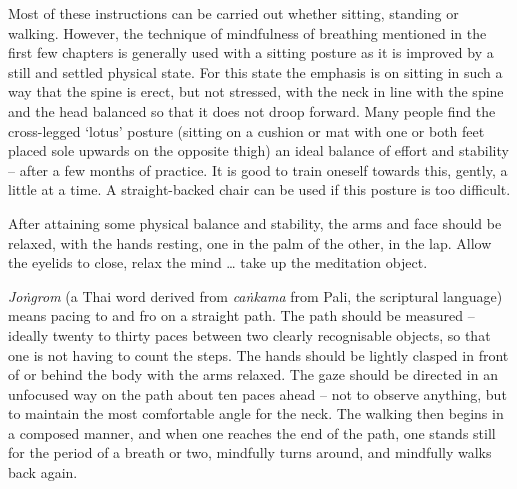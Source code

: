 
Most of these instructions can be carried out whether sitting, standing or walking. However, the technique of mindfulness of breathing mentioned in the first few chapters is generally used with a sitting posture as it is improved by a still and settled physical state. For this state the emphasis is on sitting in such a way that the spine is erect, but not stressed, with the neck in line with the spine and the head balanced so that it does not droop forward. Many people find the cross-legged `lotus' posture (sitting on a cushion or mat with one or both feet placed sole upwards on the opposite thigh) an ideal balance of effort and stability -- after a few months of practice. It is good to train oneself towards this, gently, a little at a time. A straight-backed chair can be used if this posture is too difficult.

After attaining some physical balance and stability, the arms and face should be relaxed, with the hands resting, one in the palm of the other, in the lap. Allow the eyelids to close, relax the mind \ldots{} take up the meditation object.

\textit{Joṅgrom} (a Thai word derived from \textit{caṅkama} from Pali, the scriptural language) means pacing to and fro on a straight path. The path should be measured -- ideally twenty to thirty paces between two clearly recognisable objects, so that one is not having to count the steps. The hands should be lightly clasped in front of or behind the body with the arms relaxed. The gaze should be directed in an unfocused way on the path about ten paces ahead -- not to observe anything, but to maintain the most comfortable angle for the neck. The walking then begins in a composed manner, and when one reaches the end of the path, one stands still for the period of a breath or two, mindfully turns around, and mindfully walks back again.

